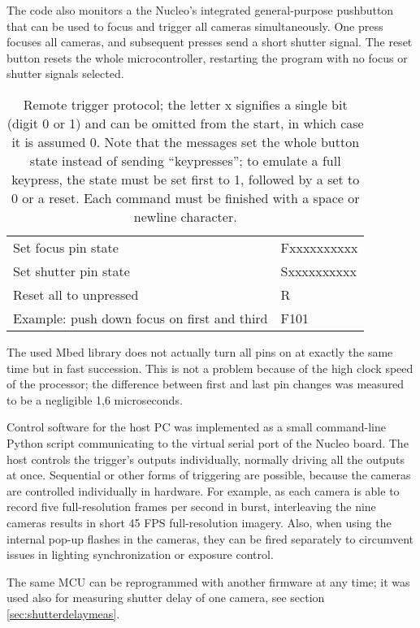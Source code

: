 The code also monitors a the Nucleo's integrated general-purpose pushbutton that can be used to focus and trigger all cameras simultaneously.
One press focuses all cameras, and subsequent presses send a short shutter signal.
The reset button resets the whole microcontroller, restarting the program with no focus or shutter signals selected.

\begin{table}[h]
	\centering
	\begin{tabular}{l l}
		Set focus pin state & Fxxxxxxxxxx\\
		Set shutter pin state & Sxxxxxxxxxx\\
		Reset all to unpressed & R\\
		Example: push down focus on first and third & F101\\
	\end{tabular}
	\caption{
		Remote trigger protocol; the letter x signifies a single bit (digit 0 or 1) and can be omitted from the start, in which case it is assumed 0.
		Note that the messages set the whole button state instead of sending ``keypresses'';
		to emulate a full keypress, the state must be set first to 1, followed by a set to 0 or a reset.
		Each command must be finished with a space or newline character.
	}
	\label{tab:triggerprotocol}
\end{table}

The used Mbed library does not actually turn all pins on at exactly the same time but in fast succession.
This is not a problem because of the high clock speed of the processor;
the difference between first and last pin changes was measured to be a negligible 1,6 microseconds.

Control software for the host PC was implemented as a small command-line Python script communicating to the virtual serial port of the Nucleo board.
The host controls the trigger's outputs individually, normally driving all the outputs at once.
Sequential or other forms of triggering are possible, because the cameras are controlled individually in hardware.
For example, as each camera is able to record five full-resolution frames per second in burst, interleaving the nine cameras results in short 45 FPS full-resolution imagery.
Also, when using the internal pop-up flashes in the cameras, they can be fired separately to circumvent issues in lighting synchronization or exposure control.

The same MCU can be reprogrammed with another firmware at any time; it was used also for measuring shutter delay of one camera, see section \ref{sec:shutterdelaymeas}.

